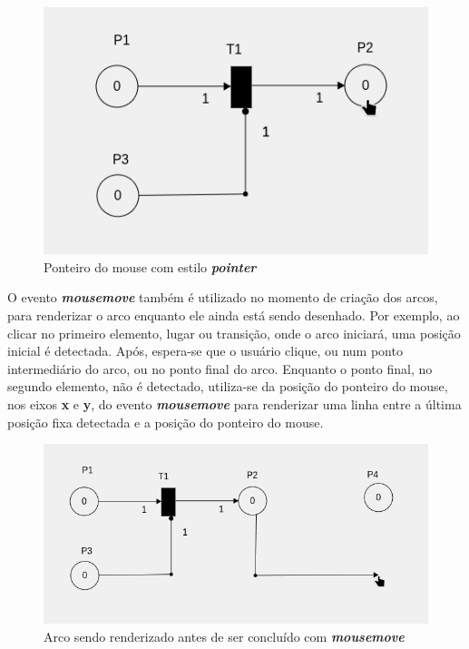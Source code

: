\documentclass[
	12pt,				%
	openright,			%
	oneside,			%
	a4paper,			%
	english,			%
	brazil				%
	]{abntex2}
\begin{document}
\begin{figure}[ht] 
	\centering
	\includegraphics[scale=0.4]{figuras/mouse_estilo_pointer.png}
	\caption[Mouse estilo default]{Ponteiro do mouse com estilo \textbf{\textit{pointer}}}
	\label{fig:mouse_estilo_pointer}
\end{figure}

O evento \textbf{\textit{mousemove}} também é utilizado no momento de criação dos arcos, para renderizar o arco enquanto ele ainda está sendo desenhado. Por exemplo, ao clicar no primeiro elemento, lugar ou transição, onde o arco iniciará, uma posição inicial é detectada. Após, espera-se que o usuário clique, ou num ponto intermediário do arco, ou no ponto final do arco. Enquanto o ponto final, no segundo elemento, não é detectado, utiliza-se da posição do ponteiro do mouse, nos eixos \textbf{x} e \textbf{y}, do evento \textbf{\textit{mousemove}} para renderizar uma linha entre a última posição fixa detectada e a posição do ponteiro do mouse.

\begin{figure}[ht] 
	\centering
	\includegraphics[scale=0.4]{figuras/mousemove_desenhando_arco.png}
	\caption[Mousemove desenhando arco]{Arco sendo renderizado antes de ser concluído com \textbf{\textit{mousemove}}}
	\label{fig:mousemove_desenhando_arco}
\end{figure}
\end{document}
